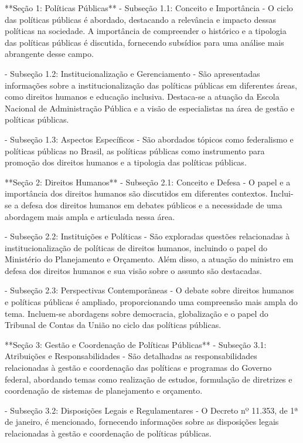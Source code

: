 \documentclass[
   article,       
   12pt,          
   oneside,       
   a4paper,       
   english,       
   brazil,        
   sumario=tradicional
   ]{abntex2}
\begin{document}
**Seção 1: Políticas Públicas**  
  - Subseção 1.1: Conceito e Importância  
    - O ciclo das políticas públicas é abordado, destacando a relevância e impacto dessas políticas na sociedade. A importância de compreender o histórico e a tipologia das políticas públicas é discutida, fornecendo subsídios para uma análise mais abrangente desse campo.

  - Subseção 1.2: Institucionalização e Gerenciamento  
    - São apresentadas informações sobre a institucionalização das políticas públicas em diferentes áreas, como direitos humanos e educação inclusiva. Destaca-se a atuação da Escola Nacional de Administração Pública e a visão de especialistas na área de gestão e políticas públicas.

  - Subseção 1.3: Aspectos Específicos  
    - São abordados tópicos como federalismo e políticas públicas no Brasil, as políticas públicas como instrumento para promoção dos direitos humanos e a tipologia das políticas públicas.

**Seção 2: Direitos Humanos**  
  - Subseção 2.1: Conceito e Defesa  
    - O papel e a importância dos direitos humanos são discutidos em diferentes contextos. Inclui-se a defesa dos direitos humanos em debates públicos e a necessidade de uma abordagem mais ampla e articulada nessa área.

  - Subseção 2.2: Instituições e Políticas  
    - São exploradas questões relacionadas à institucionalização de políticas de direitos humanos, incluindo o papel do Ministério do Planejamento e Orçamento. Além disso, a atuação do ministro em defesa dos direitos humanos e sua visão sobre o assunto são destacadas.

  - Subseção 2.3: Perspectivas Contemporâneas  
    - O debate sobre direitos humanos e políticas públicas é ampliado, proporcionando uma compreensão mais ampla do tema. Incluem-se abordagens sobre democracia, globalização e o papel do Tribunal de Contas da União no ciclo das políticas públicas.

**Seção 3: Gestão e Coordenação de Políticas Públicas**  
  - Subseção 3.1: Atribuições e Responsabilidades  
    - São detalhadas as responsabilidades relacionadas à gestão e coordenação das políticas e programas do Governo federal, abordando temas como realização de estudos, formulação de diretrizes e coordenação de sistemas de planejamento e orçamento.

  - Subseção 3.2: Disposições Legais e Regulamentares  
    - O Decreto nº 11.353, de 1ª de janeiro, é mencionado, fornecendo informações sobre as disposições legais relacionadas à gestão e coordenação de políticas públicas.
\end{document}
